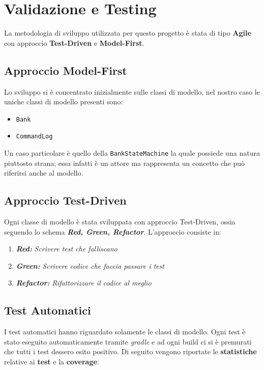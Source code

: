 \section{Validazione e Testing}
\label{Testing}
La metodologia di sviluppo utilizzata per questo progetto è stata di tipo \textbf{Agile} con approccio \textbf{Test-Driven} e \textbf{Model-First}.
  
  \subsection{Approccio Model-First}
  Lo sviluppo si è concentrato inizialmente sulle classi di modello, nel nostro caso le uniche classi di modello presenti sono: 
  \begin{itemize}
    \item \texttt{Bank}
    \item \texttt{CommandLog}
  \end{itemize}
  Un caso particolare è quello della \texttt{BankStateMachine} la quale possiede una natura piuttosto strana; essa infatti è un attore ma rappresenta un concetto che può riferirsi anche al modello.
  
  \subsection{Approccio Test-Driven}
  Ogni classe di modello è stata sviluppata con approccio Test-Driven, ossia seguendo lo schema \textbf{\textit{Red, Green, Refactor}}. L'approccio consiste in:
  \begin{enumerate}
    \item{\emph{\textbf{Red:}}}
    \emph{Scrivere test che falliscano}
    \item{\emph{\textbf{Green:}}}
    \emph{Scrivere codice che faccia passare i test}
    \item{\emph{\textbf{Refactor:}}}
    \emph{Rifattorizzare il codice al meglio}
  \end{enumerate}

  \subsection{Test Automatici}
  I test automatici hanno riguardato solamente le classi di modello. Ogni test è stato eseguito automaticamente tramite \textit{gradle} e ad ogni build ci si è premurati che tutti i test dessero esito positivo. Di seguito vengono riportate le \textbf{statistiche} relative ai \textbf{test} e la \textbf{coverage}:

